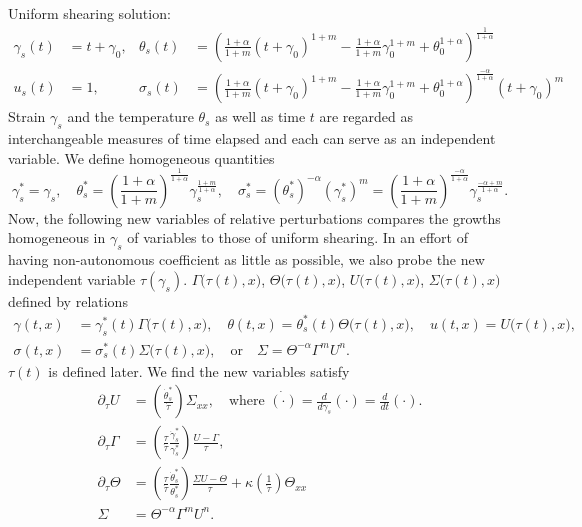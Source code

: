 \documentclass[a4paper,11pt]{article}
\theoremstyle{remark}
\begin{document}
Uniform shearing solution:
\begin{equation}
\begin{aligned}
 \gamma_s(t) &= t+\gamma_0, & \theta_s(t) &= \left(\frac{1+\alpha}{1+m} (t+\gamma_0)^{1+m} - \frac{1+\alpha}{1+m} \gamma_0^{1+m} + \theta_0^{1+\alpha}   \right)^{\frac{1}{1+\alpha}}\\
  u_s(t) &=1, & \sigma_s(t)&=\left(\frac{1+\alpha}{1+m} (t+\gamma_0)^{1+m} - \frac{1+\alpha}{1+m} \gamma_0^{1+m} + \theta_0^{1+\alpha}   \right)^{\frac{-\alpha}{1+\alpha}}(t+\gamma_0)^m
\end{aligned}
\end{equation}
Strain $\gamma_s$ and the temperature $\theta_s$ as well as time $t$ are regarded as interchangeable measures of time elapsed and each can serve as an independent variable. We define homogeneous quantities
$$ \gamma_s^* = \gamma_s, \quad \theta_s^*=\left( \frac{1+\alpha}{1+m}\right)^{\frac{1}{1+\alpha}} \gamma_s^{\frac{1+m}{1+\alpha}}, \quad \sigma^*_s = (\theta_s^*)^{-\alpha}(\gamma_s^*)^m = \left( \frac{1+\alpha}{1+m}\right)^{\frac{-\alpha}{1+\alpha}}\gamma_s^{\frac{-\alpha+m}{1+\alpha}}.$$
Now, the following new variables of relative perturbations compares the growths homogeneous in $\gamma_s$ of variables to those of uniform shearing. In an effort of having non-autonomous coefficient as little as possible, we also probe the new independent variable $\tau(\gamma_s)$.
$\Gamma\big(\tau(t),x\big)$, $\Theta\big(\tau(t),x\big)$, $U\big(\tau(t),x\big)$, $\Sigma\big(\tau(t),x\big)$ defined by relations
\begin{equation}
 \begin{aligned}
  \gamma(t,x) &= \gamma^*_s(t)\Gamma\big(\tau(t),x\big), \quad \theta(t,x) = \theta^*_s(t)\Theta\big(\tau(t),x\big), \quad u(t,x)=U\big(\tau(t),x\big),\\
  \sigma(t,x) &= \sigma^*_s(t)\Sigma\big(\tau(t),x\big), \quad \text{or} \quad \Sigma = \Theta^{-\alpha}\Gamma^m U^n.
 \end{aligned}
\end{equation}
$\tau(t)$ is defined later. We find the new variables satisfy
\begin{equation*}
 \begin{aligned}
  \partial_\tau U &= \left(\frac{\dot\theta^*_s}{\dot{\tau}}\right) \Sigma_{xx}, \quad \text{where $\dot{(\cdot)}=\frac{d}{d\gamma_s}(\cdot)=\frac{d}{dt}(\cdot)$.} \\
  \partial_\tau \Gamma &= \left(\frac{\tau}{\dot\tau} \frac{\dot\gamma^*_s}{\gamma^*_s}\right) \frac{U-\Gamma}{\tau},\\
  \partial_\tau \Theta &= \left(\frac{\tau}{\dot\tau} \frac{\dot\theta^*_s}{\theta^*_s}\right) \frac{\Sigma U - \Theta}{\tau} + \kappa\left(\frac{1}{\dot\tau}\right) \Theta_{xx}\\
  \Sigma&=\Theta^{-\alpha}\Gamma^m U^n.
 \end{aligned}
\end{equation*}
\end{document}
